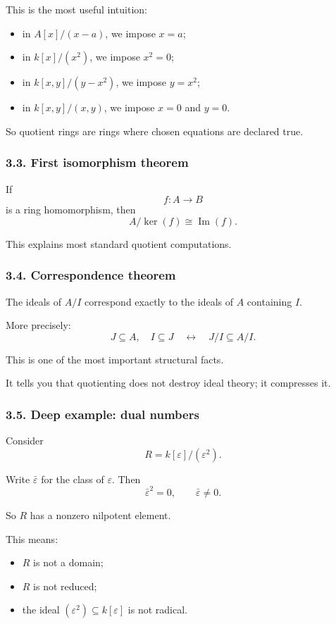 \documentclass[12pt,a4paper]{article}
\theoremstyle{plain}
\theoremstyle{definition}      %
\begin{document}
	This is the most useful intuition:
	
	\begin{itemize}
		\item in \(A[x]/(x-a)\), we impose \(x=a\);
		\item in \(k[x]/(x^2)\), we impose \(x^2=0\);
		\item in \(k[x,y]/(y-x^2)\), we impose \(y=x^2\);
		\item in \(k[x,y]/(x,y)\), we impose \(x=0\) and \(y=0\).
	\end{itemize}
	
	So quotient rings are rings where chosen equations are declared true.
	
	\subsubsection*{3.3. First isomorphism theorem}
	
	If
	\[
	f:A\to B
	\]
	is a ring homomorphism, then
	\[
	A/\ker(f)\cong \operatorname{Im}(f).
	\]
	
	This explains most standard quotient computations.
	
	\subsubsection*{3.4. Correspondence theorem}
	
	The ideals of \(A/I\) correspond exactly to the ideals of \(A\) containing \(I\).
	
	More precisely:
	\[
	J\subseteq A,\quad I\subseteq J
	\quad\longleftrightarrow\quad
	J/I\subseteq A/I.
	\]
	
	This is one of the most important structural facts.
	
	It tells you that quotienting does not destroy ideal theory; it compresses it.
	
	\subsubsection*{3.5. Deep example: dual numbers}
	
	Consider
	\[
	R=k[\varepsilon]/(\varepsilon^2).
	\]
	
	Write \(\bar\varepsilon\) for the class of \(\varepsilon\). Then
	\[
	\bar\varepsilon^2=0,\qquad \bar\varepsilon\neq 0.
	\]
	
	So \(R\) has a nonzero nilpotent element.
	
	This means:
	\begin{itemize}
		\item \(R\) is not a domain;
		\item \(R\) is not reduced;
		\item the ideal \((\varepsilon^2)\subseteq k[\varepsilon]\) is not radical.
	\end{itemize}
	
\end{document}
